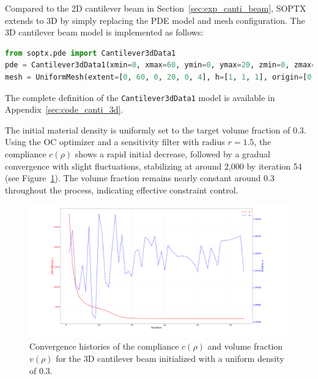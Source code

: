 \documentclass[mathpazo]{cicp}
\begin{document}
Compared to the 2D cantilever beam in Section~\ref{sec:exp_canti_beam}, SOPTX extends to 3D by simply replacing the PDE model and mesh configuration. The 3D cantilever beam model is implemented as follows:
\begin{lstlisting}[language=python]
from soptx.pde import Cantilever3dData1
pde = Cantilever3dData1(xmin=0, xmax=60, ymin=0, ymax=20, zmin=0, zmax=4, T=-1)
mesh = UniformMesh(extent=[0, 60, 0, 20, 0, 4], h=[1, 1, 1], origin=[0, 0, 0])
\end{lstlisting}
The complete definition of the \texttt{Cantilever3dData1} model is available in Appendix~\ref{sec:code_canti_3d}.

The initial material density is uniformly set to the target volume fraction of 0.3. Using the OC optimizer and a sensitivity filter with radius $r=1.5$, the compliance $c(\rho)$ shows a rapid initial decrease, followed by a gradual convergence with slight fluctuations, stabilizing at around 2,000 by iteration 54 (see Figure~\ref{fig:canti_3d_convergence}). The volume fraction remains nearly constant around 0.3 throughout the process, indicating effective constraint control.
\begin{figure}[htbp]
	\centering
	\includegraphics[width=1.0\textwidth]{figures/cantilever_3d_convergence.png}
	\caption{Convergence histories of the compliance $c(\rho)$ and volume fraction $v(\rho)$ for the 3D cantilever beam initialized with a uniform density of 0.3.}
	\label{fig:canti_3d_convergence}
\end{figure}
\end{document}
